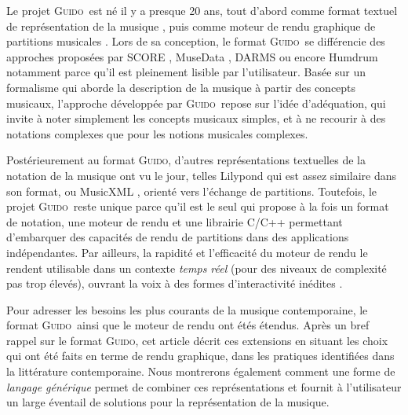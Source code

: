 \documentclass{article}
\newcommand{\guido}			{\textsc{Guido}}
\begin{document}
Le projet \guido\ est né il y a presque 20 ans, tout d'abord comme format textuel de représentation de la musique \cite{hoos98,guido}, puis comme moteur de rendu graphique de partitions musicales \cite{RENZ02}. 
Lors de sa conception, le format \guido\ se différencie des approches proposées par SCORE \cite{SCORE}, MuseData \cite{Hewlett97}, DARMS \cite{darms} ou encore Humdrum \cite{Huron97} notamment parce qu'il est pleinement lisible par l'utilisateur. Basée sur un formalisme qui aborde la description de la musique à partir des concepts musicaux, l'approche développée par \guido\ repose sur l'idée d'adéquation, qui invite à noter simplement les concepts musicaux simples, et à ne recourir à des notations complexes que pour les notions musicales complexes.

Postérieurement au format \guido, d'autres représentations textuelles de la notation de la musique ont vu le jour, telles Lilypond \cite{lilypond03,lilypond06} qui est assez similaire dans son format, ou MusicXML \cite{good01}, orienté vers l'échange de partitions. Toutefois, le projet \guido\ reste unique parce qu'il est le seul qui propose à la fois un format de notation, une moteur de rendu et une librairie C/C++ permettant d'embarquer des capacités de rendu de partitions dans des applications indépendantes.
Par ailleurs, la rapidité et l'efficacité du moteur de rendu le rendent utilisable dans un contexte \textit{temps réel} (pour des niveaux de complexité pas trop élevés), ouvrant la voix à des formes d'interactivité inédites \cite{Hoadley12,Fober:12a}.

Pour adresser les besoins les plus courants de la musique contemporaine, le format \guido\ ainsi que le moteur de rendu ont étés étendus. Après un bref rappel sur le format \guido, cet article décrit ces extensions en  situant les choix qui ont été faits en terme de rendu graphique, dans les pratiques identifiées dans la littérature contemporaine. Nous montrerons également comment une forme de \emph{langage générique} permet de combiner ces représentations et fournit à l'utilisateur un large éventail de solutions pour la représentation de la musique.


\end{document}
